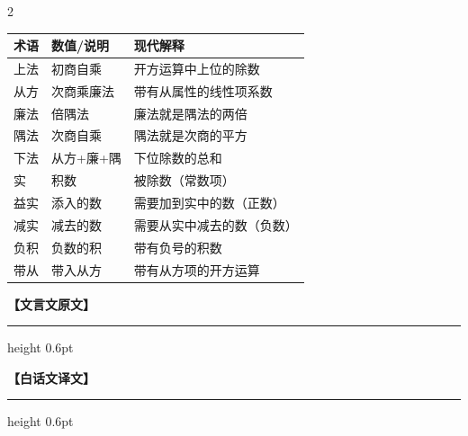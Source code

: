 \documentclass[11pt,a4paper]{article}
\newcommand{\colheaders}{%
  \noindent\begin{minipage}[t]{0.48\textwidth}\centering
    \textbf{\color{classicalframe}【文言文原文】}
    \vspace{0.3em}
    \hrule height 0.6pt
  \end{minipage}%
  \hfill
  \begin{minipage}[t]{0.48\textwidth}\centering
    \textbf{\color{modernframe}【白话文译文】}
    \vspace{0.3em}
    \hrule height 0.6pt
  \end{minipage}
  \par\medskip
}
\begin{document}
\begin{paracol}{2}
\begin{center}
\begin{tabular}{|l|l|p{4.5cm}|}
\hline
\textbf{术语} & \textbf{数值/说明} & \textbf{现代解释} \\
\hline
上法 & 初商自乘 & 开方运算中上位的除数 \\
\hline
从方 & 次商乘廉法 & 带有从属性的线性项系数 \\
\hline
廉法 & 倍隅法 & 廉法就是隅法的两倍 \\
\hline
隅法 & 次商自乘 & 隅法就是次商的平方 \\
\hline
下法 & 从方+廉+隅 & 下位除数的总和 \\
\hline
实 & 积数 & 被除数（常数项） \\
\hline
益实 & 添入的数 & 需要加到实中的数（正数） \\
\hline
减实 & 减去的数 & 需要从实中减去的数（负数） \\
\hline
负积 & 负数的积 & 带有负号的积数 \\
\hline
带从 & 带入从方 & 带有从方项的开方运算 \\
\hline
\end{tabular}
\end{center}

\switchcolumn*

\end{paracol}
\clearpage
\colheaders
\end{document}
